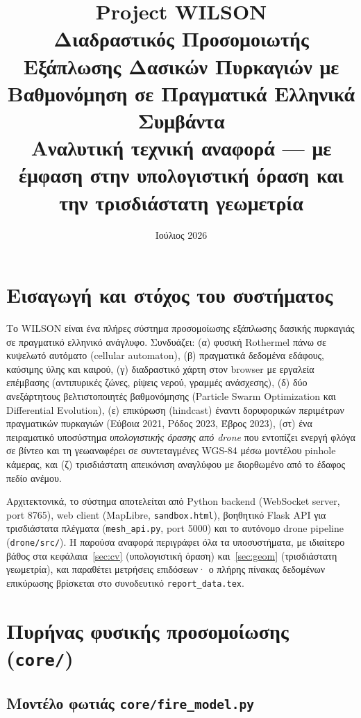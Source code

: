 \documentclass[11pt]{article}
\title{\textbf{Project WILSON}\\[2pt]
\large Διαδραστικός Προσομοιωτής Εξάπλωσης Δασικών Πυρκαγιών
με Βαθμονόμηση σε Πραγματικά Ελληνικά Συμβάντα\\[4pt]
\normalsize Αναλυτική τεχνική αναφορά --- με έμφαση στην υπολογιστική όραση
και την τρισδιάστατη γεωμετρία}
\date{Ιούλιος 2026}
\newcommand{\code}[1]{\texttt{#1}}
\begin{document}
\maketitle
\tableofcontents
\newpage

\section{Εισαγωγή και στόχος του συστήματος}

Το WILSON είναι ένα πλήρες σύστημα προσομοίωσης εξάπλωσης δασικής πυρκαγιάς
σε πραγματικό ελληνικό ανάγλυφο. Συνδυάζει: (α) φυσική Rothermel πάνω σε
κυψελωτό αυτόματο (cellular automaton), (β) πραγματικά δεδομένα εδάφους,
καύσιμης ύλης και καιρού, (γ) διαδραστικό χάρτη στον browser με εργαλεία
επέμβασης (αντιπυρικές ζώνες, ρίψεις νερού, γραμμές ανάσχεσης), (δ) δύο
ανεξάρτητους βελτιστοποιητές βαθμονόμησης (Particle Swarm Optimization και
Differential Evolution), (ε) επικύρωση (hindcast) έναντι δορυφορικών
περιμέτρων πραγματικών πυρκαγιών (Εύβοια 2021, Ρόδος 2023, Έβρος 2023),
(στ) ένα πειραματικό υποσύστημα \emph{υπολογιστικής όρασης από drone} που
εντοπίζει ενεργή φλόγα σε βίντεο και τη γεωαναφέρει σε συντεταγμένες WGS-84
μέσω μοντέλου pinhole κάμερας, και (ζ) τρισδιάστατη απεικόνιση αναγλύφου με
διορθωμένο από το έδαφος πεδίο ανέμου.

Αρχιτεκτονικά, το σύστημα αποτελείται από Python backend (WebSocket server,
port 8765), web client (MapLibre, \code{sandbox.html}), βοηθητικό Flask API
για τρισδιάστατα πλέγματα (\code{mesh\_api.py}, port 5000) και το αυτόνομο
drone pipeline (\code{drone/src/}). Η παρούσα αναφορά περιγράφει όλα τα
υποσυστήματα, με ιδιαίτερο βάθος στα κεφάλαια~\ref{sec:cv}
(υπολογιστική όραση) και~\ref{sec:geom} (τρισδιάστατη γεωμετρία), και
παραθέτει μετρήσεις επιδόσεων· ο πλήρης πίνακας δεδομένων επικύρωσης
βρίσκεται στο συνοδευτικό \code{report\_data.tex}.

\section{Πυρήνας φυσικής προσομοίωσης (\code{core/})}

\subsection{Μοντέλο φωτιάς \code{core/fire\_model.py}}
\end{document}
